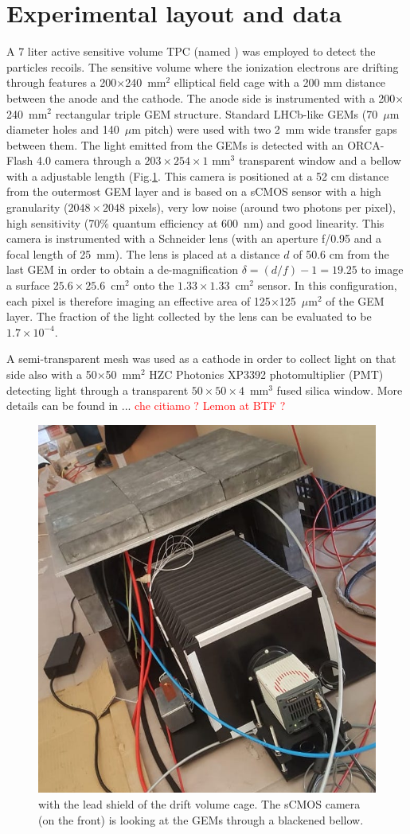 \documentclass[12pt]{iopart}
\begin{document}
\section{Experimental layout and data }
\label{sec:layout}
 A 7 liter active sensitive volume TPC  (named \lemon  \cite{paperBTF} ) was employed to detect the particles recoils. The sensitive volume where the ionization electrons are drifting through
features   a  200$\times$240~mm$^2$ elliptical field cage with a 200 mm distance between the anode and the cathode. The anode side is instrumented with a 200$\times$240~mm$^2$ rectangular triple  GEM structure.
Standard LHCb-like \cite{bib:thesis} GEMs  (70~$\mu$m diameter holes and 140~$\mu$m pitch) were used with two 2~mm wide transfer gaps between them. The light emitted from the GEMs is detected with   an ORCA-Flash 4.0 camera \cite{ORCAcamera} through a  $203\times254\times1$ mm$^3$ transparent window and a  bellow with a adjustable length (Fig.\ref{fig:LemonShielded}.  This camera is positioned  at a 52 cm  distance from the outermost  GEM layer and is based on a sCMOS sensor with a high granularity ($2048\times2048$ pixels), very low noise (around two photons per pixel), high sensitivity (70\%  quantum efficiency at  600~nm) and good linearity. This camera is instrumented with a Schneider lens (with an aperture f/0.95 and a focal length of 25~mm). The lens is placed at a distance $d$ of 50.6 cm from the last GEM
in order to obtain a de-magnification
$\delta = (d/f) - 1 = 19.25$ to
image a surface $25.6 \times 25.6$~cm$^2$ onto the
$1.33 \times 1.33$~cm$^2$ sensor.
In this configuration, each pixel
 is therefore imaging  an effective area of 125$\times$125~$\mu$m$^2$ of the GEM layer. The fraction of the light collected by the lens can be evaluated \cite{bib:jinst_orange1} to be $1.7 \times 10^{-4}$.

A semi-transparent mesh was used as a cathode in order to collect light on that side also with a 50$\times$50~mm$^2$ HZC Photonics XP3392 photomultiplier \cite{PMTPhotonics} (PMT) detecting light through a transparent $50\times50\times4$~mm$^3$ fused silica window. More details can be found in ... \textcolor{red}{che citiamo ? Lemon at BTF ? }


 
\begin{figure}[ht]
	\centering
	\includegraphics[width=0.45\linewidth]{LEMON-Shielded.jpg}
  	\caption{\lemon with the lead shield of the  drift volume cage. The sCMOS camera (on the front) is looking at the GEMs through a blackened bellow.}
  	\label{fig:LemonShielded}
\end{figure}
\end{document}

